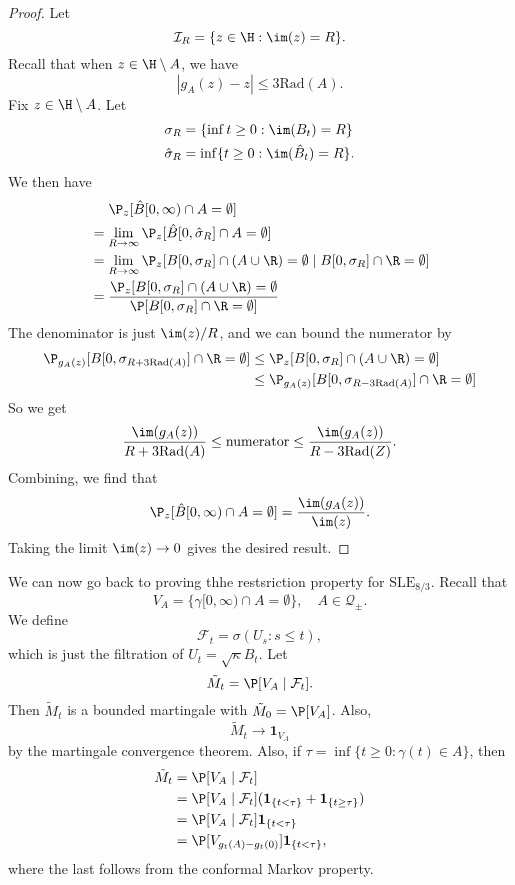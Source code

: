 \documentclass[a4paper]{article}
\newcommand\SLE{\mathrm{SLE}}
\newcommand\rad{\mathrm{Rad}}
\begin{document}
\begin{proof}
  Let
  \[
    \mathcal{I}_R = \{z \in \H: \im (z) = R\}.
  \]
  Recall that when $z \in \H \setminus A$, we have
  \[
    |g_A(z) - z| \leq 3 \rad(A).
  \]
  Fix $z \in \H \setminus A$. Let
  \begin{align*}
    \sigma_R &= \{\inf t \geq 0: \im(B_t) = R\}\\
    \hat{\sigma}_R &= \inf \{t \geq 0: \im (\hat{B}_t) = R\}.
  \end{align*}
  We then have
  \begin{align*}
    &\hphantom{ {}={}}\P_z[\hat{B}[0, \infty) \cap A = \emptyset]\\
    &= \lim_{R \to \infty} \P_z[\hat{B}[0, \hat{\sigma}_R] \cap A = \emptyset]\\
    &= \lim_{R \to \infty} \P_z[B[0, \sigma_R] \cap (A \cup \R) = \emptyset \mid B[0, \sigma_R] \cap \R = \emptyset]\\
    &= \frac{\P_z[B[0, \sigma_R] \cap (A \cup \R) = \emptyset}{\P[B[0, \sigma_R] \cap \R = \emptyset]}
  \end{align*}
  The denominator is just $\im(z) / R$, and we can bound the numerator by
  \begin{align*}
    \P_{g_A(z)} [B[0, \sigma_{R + 3\rad(A)}] \cap \R = \emptyset] &\leq \P_z[B[0, \sigma_R] \cap (A \cup \R) = \emptyset]\\
    &\leq \P_{g_A(z)}[B[0, \sigma_{R - 3 \rad(A)}] \cap \R = \emptyset]
  \end{align*}
  So we get
  \[
    \frac{\im(g_A(z))}{R+ 3 \rad(A)} \leq \text{numerator} \leq \frac{\im(g_A(z))}{R - 3 \rad(Z)}.
  \]
  Combining, we find that
  \[
    \P_z[\hat{B}[0, \infty) \cap A = \emptyset] = \frac{\im(g_A(z))}{\im(z)}.
  \]
  Taking the limit $\im(z) \to 0$ gives the desired result.
\end{proof}
We can now go back to proving thhe restsriction property for $\SLE_{8/3}$. Recall that
\[
  V_A = \{\gamma [0, \infty) \cap A = \emptyset\},\quad A \in \mathcal{Q}_{\pm}.
\]
We define
\[
  \mathcal{F}_t = \sigma(U_s: s \leq t),
\]
which is just the filtration of $U_t = \sqrt{\kappa} B_t$. Let
\[
  \tilde{M}_t = \P[V_A \mid \mathcal{F}_t].
\]
Then $\tilde{M}_t$ is a bounded martingale with $\tilde{M}_0 = \P[V_A]$. Also,
\[
  \tilde{M}_t \to \mathbf{1}_{V_A}
\]
by the martingale convergence theorem. Also, if $\tau = \inf \{t \geq 0: \gamma(t) \in A\}$, then
\begin{align*}
  \tilde{M}_t &= \P[V_A \mid \mathcal{F}_t] \\
  &= \P[V_A \mid \mathcal{F}_t] (\mathbf{1}_{\{t < \tau\}} + \mathbf{1}_{\{t \geq \tau\}}) \\
  &= \P[V_A \mid \mathcal{F}_t] \mathbf{1}_{\{t < \tau\}}\\
  &= \P[V_{g_t(A) - g_t(0)}] \mathbf{1}_{\{t < \tau\}},
\end{align*}
where the last follows from the conformal Markov property.
\end{document}
